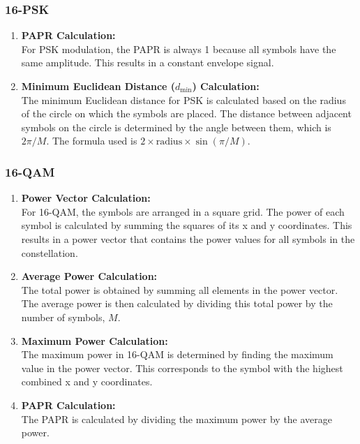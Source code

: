 \documentclass[11pt,a4paper,oneside]{article}
\begin{document}
\subsubsection{16-PSK}
\begin{enumerate}[itemsep=2ex, left=0pt, labelwidth=2em, align=left]
    \item \textbf{PAPR Calculation:}\\
    For PSK modulation, the PAPR is always 1 because all symbols have the same amplitude. This results in a constant envelope signal.
    
    \vspace{1ex}
    
    \item \textbf{Minimum Euclidean Distance (\(d_{\text{min}}\)) Calculation:}\\
    The minimum Euclidean distance for PSK is calculated based on the radius of the circle on which the symbols are placed. The distance between adjacent symbols on the circle is determined by the angle between them, which is \(2 \pi / M\). The formula used is \(2 \times \text{radius} \times \sin(\pi / M)\).
\end{enumerate}

\subsubsection{16-QAM}
\begin{enumerate}[itemsep=2ex, left=0pt, labelwidth=2em, align=left]
    \item \textbf{Power Vector Calculation:}\\
    For 16-QAM, the symbols are arranged in a square grid. The power of each symbol is calculated by summing the squares of its x and y coordinates. This results in a power vector that contains the power values for all symbols in the constellation.
    
    \vspace{1ex}
    
    \item \textbf{Average Power Calculation:}\\
    The total power is obtained by summing all elements in the power vector. The average power is then calculated by dividing this total power by the number of symbols, \(M\).
    
    \vspace{1ex}
    
    \item \textbf{Maximum Power Calculation:}\\
    The maximum power in 16-QAM is determined by finding the maximum value in the power vector. This corresponds to the symbol with the highest combined x and y coordinates.
    
    \vspace{1ex}
    
    \item \textbf{PAPR Calculation:}\\
    The PAPR is calculated by dividing the maximum power by the average power.
\end{enumerate}
\end{document}

